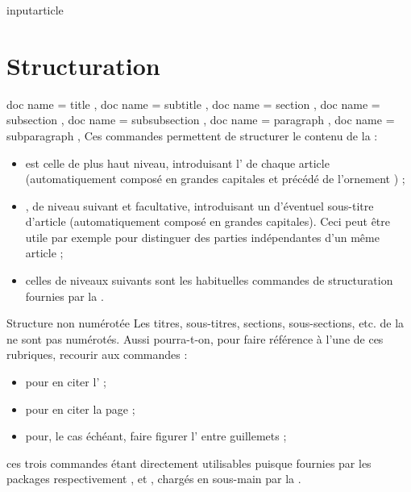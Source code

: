\documentclass{letgut}
\begin{document}
\begin{docCommand}{inputarticle}{}
\end{docCommand}

\section{Structuration}
\label{sec:structuration}

\begin{docCommands}[
  doc parameter = \oarg{intitulé alternatif}\marg{intitulé}
  ]
  {
    { doc name = title },
    { doc name = subtitle },
    { doc name = section },
    { doc name = subsection },
    { doc name = subsubsection },
    { doc name = paragraph },
    { doc name = subparagraph },
  }
  Ces commandes permettent de structurer le contenu de la  :
  \begin{itemize}
  \item {} est celle de plus haut niveau, introduisant
    l' de chaque article (automatiquement composé en grandes
    capitales et précédé de l'ornement \aldineleft) ;
  \item {}, de niveau suivant et facultative, introduisant un
     d'éventuel sous-titre d'article (automatiquement composé en
    grandes capitales). Ceci peut être utile par exemple pour distinguer des
    parties indépendantes d'un même article ;
  \item celles de niveaux suivants sont les habituelles commandes de
    structuration fournies par la .
  \end{itemize}
\end{docCommands}

\begin{dbremark}{Structure non numérotée}{}
  Les titres, sous-titres, sections, sous-sections, etc. de la  ne sont
  pas numérotés. Aussi pourra-t-on, pour faire référence à l'une de ces
  rubriques, recourir aux commandes :
  \begin{itemize}
  \item {} pour en citer l' ;
  \item {} pour en citer la page ;
  \item {} pour, le cas échéant, faire figurer
    l' entre guillemets ;
  \end{itemize}
  ces trois commandes étant directement utilisables puisque fournies par les
  packages respectivement ,  et
  , chargés en sous-main par la .
\end{dbremark}
\end{document}
